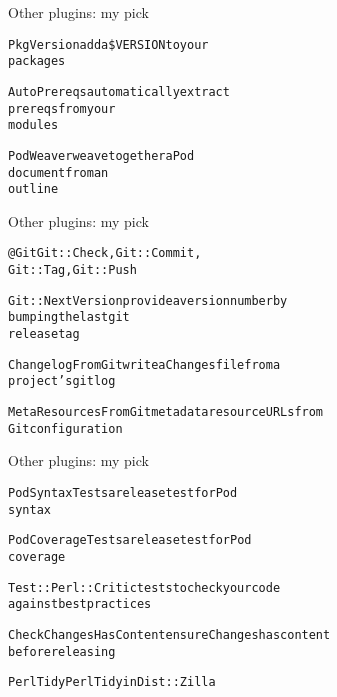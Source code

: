 \documentclass[serif,14pt,color=usenames,dvipsnames]{beamer}
\begin{document}
\begin{frame}[fragile]{Other plugins: my pick}
\linespread{0.8}
\begin{alltt}
PkgVersion   add a \$VERSION to your
             packages

AutoPrereqs  automatically extract
             prereqs from your
             modules

PodWeaver    weave together a Pod
             document from an
             outline
\end{alltt}
\end{frame}

\begin{frame}[fragile]{Other plugins: my pick}
\linespread{0.8}
\small
\begin{alltt}
@Git                  Git::Check, Git::Commit,
                      Git::Tag, Git::Push

Git::NextVersion      provide a version number by
                      bumping the last git
                      release tag

ChangelogFromGit      write a Changes file from a
                      project's git log

MetaResourcesFromGit  metadata resource URLs from
                      Git configuration
\end{alltt}
\end{frame}

\begin{frame}[fragile]{Other plugins: my pick}
\linespread{0.8}
\small
\begin{alltt}
PodSyntaxTests          a release test for Pod
                        syntax

PodCoverageTests        a release test for Pod
                        coverage

Test::Perl::Critic      tests to check your code
                        against best practices 

CheckChangesHasContent  ensure Changes has content
                        before releasing

PerlTidy                PerlTidy in Dist::Zilla
\end{alltt}
\end{frame}
\end{document}
